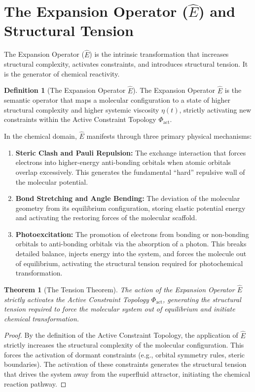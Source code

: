 \documentclass[11pt,openany]{extbook}
\theoremstyle{plain}
\newtheorem{theorem}{Theorem}[chapter]
\theoremstyle{definition}
\newtheorem{definition}{Definition}[chapter]
\begin{document}
\section{The Expansion Operator ($\hat{E}$) and Structural Tension}

The Expansion Operator ($\hat{E}$) is the intrinsic transformation that increases structural complexity, activates constraints, and introduces structural tension. It is the generator of chemical reactivity.

\begin{definition}[The Expansion Operator $\hat{E}$]
The Expansion Operator $\hat{E}$ is the semantic operator that maps a molecular configuration to a state of higher structural complexity and higher systemic viscosity $\eta(t)$, strictly activating new constraints within the Active Constraint Topology $\Phi_{\text{act}}$.
\end{definition}

In the chemical domain, $\hat{E}$ manifests through three primary physical mechanisms:
\begin{enumerate}
    \item \textbf{Steric Clash and Pauli Repulsion:} The exchange interaction that forces electrons into higher-energy anti-bonding orbitals when atomic orbitals overlap excessively. This generates the fundamental ``hard'' repulsive wall of the molecular potential.
    \item \textbf{Bond Stretching and Angle Bending:} The deviation of the molecular geometry from its equilibrium configuration, storing elastic potential energy and activating the restoring forces of the molecular scaffold.
    \item \textbf{Photoexcitation:} The promotion of electrons from bonding or non-bonding orbitals to anti-bonding orbitals via the absorption of a photon. This breaks detailed balance, injects energy into the system, and forces the molecule out of equilibrium, activating the structural tension required for photochemical transformation.
\end{enumerate}

\begin{theorem}[The Tension Theorem]
The action of the Expansion Operator $\hat{E}$ strictly activates the Active Constraint Topology $\Phi_{\text{act}}$, generating the structural tension required to force the molecular system out of equilibrium and initiate chemical transformation.
\end{theorem}
\begin{proof}
By the definition of the Active Constraint Topology, the application of $\hat{E}$ strictly increases the structural complexity of the molecular configuration. This forces the activation of dormant constraints (e.g., orbital symmetry rules, steric boundaries). The activation of these constraints generates the structural tension that drives the system away from the superfluid attractor, initiating the chemical reaction pathway.
\end{proof}
\end{document}
